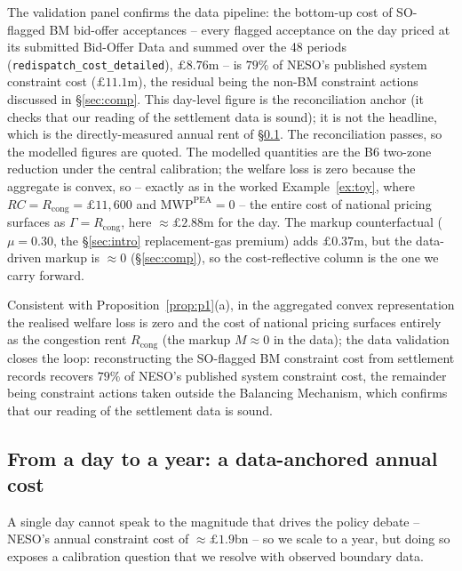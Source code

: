 \documentclass[review,3p,times]{elsarticle}
\theoremstyle{plain}
\theoremstyle{definition}
\begin{document}
The validation panel confirms the data pipeline: the bottom-up cost of
SO-flagged BM bid-offer acceptances -- every flagged acceptance on the day priced
at its submitted Bid-Offer Data and summed over the 48 periods
(\texttt{redispatch\_cost\_detailed}), $\pounds8.76$m -- is $79\%$ of NESO's
published system constraint cost ($\pounds11.1$m), the residual being the non-BM
constraint actions discussed in \S\ref{sec:comp}. This day-level figure is the
reconciliation anchor (it checks that our reading of the settlement data is sound);
it is not the headline, which is the directly-measured annual rent of
\S\ref{sec:annual}. The reconciliation passes, so the modelled figures are quoted. The modelled
quantities are the B6 two-zone reduction under the central calibration; the
welfare loss is zero because the aggregate is convex, so -- exactly as in the
worked Example~\ref{ex:toy}, where $RC=R_{\mathrm{cong}}=\pounds11{,}600$ and
$\mathrm{MWP}^{\mathrm{PEA}}=0$ -- the entire cost of national pricing surfaces as
$\Gamma=R_{\mathrm{cong}}$, here $\approx\pounds2.88$m for the day. The
markup counterfactual ($\mu=0.30$, the \S\ref{sec:intro} replacement-gas premium)
adds $\pounds0.37$m, but the data-driven
markup is $\approx0$ (\S\ref{sec:comp}), so the cost-reflective column is the one
we carry forward.

Consistent with Proposition~\ref{prop:p1}(a), in the aggregated convex
representation the realised welfare loss is zero and the cost of national
pricing surfaces entirely as the congestion rent $R_{\mathrm{cong}}$ (the markup
$M\approx0$ in the data); the data validation closes the loop: reconstructing the
SO-flagged BM constraint cost from settlement records recovers $79\%$ of NESO's
published system constraint cost, the remainder being constraint actions taken
outside the Balancing Mechanism, which confirms that our reading of the
settlement data is sound.

\subsection{From a day to a year: a data-anchored annual cost}
\label{sec:annual}

A single day cannot speak to the magnitude that drives the policy debate -- NESO's
annual constraint cost of $\approx\pounds1.9$bn -- so we scale to a year, but doing
so exposes a calibration question that we resolve with observed boundary data.
\end{document}

